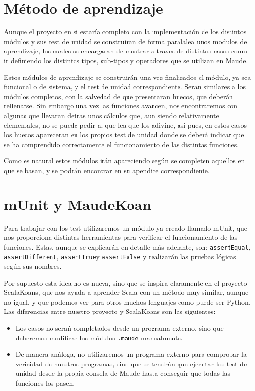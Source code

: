 \section{Método de aprendizaje}

Aunque el proyecto en si estaría completo con la implementación de los distintos módulos y sus test de unidad se construiran de forma paralalea unos modulos de aprendizaje, los cuales se encargaran de mostrar a traves de distintos casos como ir definiendo los distintos tipos, sub-tipos y operadores que se utilizan en Maude.\par

Estos módulos de aprendizaje se construirán una vez finalizados el módulo, ya sea funcional o de sistema, y el test de unidad correspondiente. Seran similares a los módulos completos, con la salvedad de que presentaran huecos, que deberán rellenarse. Sin embargo una vez las funciones avancen, nos encontraremos con algunas que llevaran detras unos cálculos que, aun siendo relativamente elementales, no se puede pedir al que lea que los adivine, así pues, en estos casos los huecos apareceran en los propios test de unidad donde se deberá indicar que se ha comprendido correctamente el funcionamiento de las distintas funciones. \par

Como es natural estos módulos irán apareciendo según se completen aquellos en que se basan, y se podrán encontrar en su apendice correspondiente.\par 


\section{mUnit y MaudeKoan}

Para trabajar con los test utilizaremos un módulo ya creado llamado mUnit, que nos proporciona distintas herramientas para verificar el funcionamiento de las funciones. Estas, aunque se explicarán en detalle más adelante, son: \verb"assertEqual", \verb"assertDifferent", \verb"assertTrue"y \verb"assertFalse" y realizarán las pruebas lógicas según sus nombres.\par

Por supuesto esta idea no es nueva, sino que se inspira claramente en el proyecto ScalaKoans, que nos ayuda a aprender Scala con un método muy similar, aunque no igual, y que podemos ver para otros muchos lenguajes como puede ser Python. Las diferencias entre nuestro proyecto y ScalaKoans son las siguientes:\par
\begin{itemize}
\item Los casos no serań completados desde un programa externo, sino que deberemos modificar los módulos \texttt{.maude} manualmente.
\item De manera análoga, no utilizaremos un programa externo para comprobar la vericidad de nuestros programas, sino que se tendrán que ejecutar los test de unidad desde la propia consola de Maude hasta conseguir que todas las funciones los pasen.
\end{itemize}

